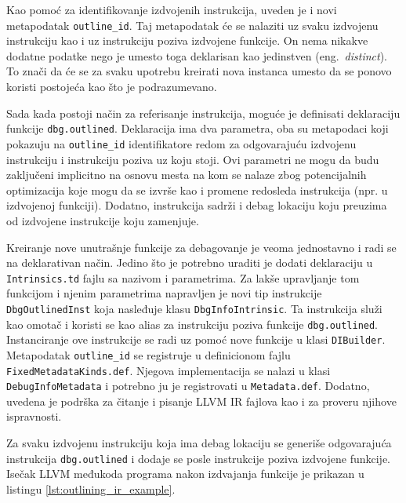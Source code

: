 \documentclass[12pt,oneside]{memoir}
\begin{document}
Kao pomoć za identifikovanje izdvojenih instrukcija, uveden je i novi metapodatak \verb|outline_id|.
Taj metapodatak će se nalaziti uz svaku izdvojenu instrukciju kao i uz instrukciju poziva izdvojene funkcije.
On nema nikakve dodatne podatke nego je umesto toga deklarisan kao jedinstven (eng.~{\em distinct}).
To znači da će se za svaku upotrebu kreirati nova instanca umesto da se ponovo koristi postojeća kao što je podrazumevano.

Sada kada postoji način za referisanje instrukcija, moguće je definisati deklaraciju funkcije \verb|dbg.outlined|.
Deklaracija ima dva parametra, oba su metapodaci koji pokazuju na \verb|outline_id| identifikatore redom za odgovarajuću izdvojenu instrukciju i instrukciju poziva uz koju stoji.
Ovi parametri ne mogu da budu zaključeni implicitno na osnovu mesta na kom se nalaze zbog potencijalnih optimizacija koje mogu da se izvrše kao i promene redosleda instrukcija (npr. u izdvojenoj funkciji).
Dodatno, instrukcija sadrži i debag lokaciju koju preuzima od izdvojene instrukcije koju zamenjuje.

Kreiranje nove unutrašnje funkcije za debagovanje je veoma jednostavno i radi se na deklarativan način.
Jedino što je potrebno uraditi je dodati deklaraciju u \verb|Intrinsics.td| fajlu sa nazivom i parametrima.
Za lakše upravljanje tom funkcijom i njenim parametrima napravljen je novi tip instrukcije \verb|DbgOutlinedInst| koja nasleđuje klasu \verb|DbgInfoIntrinsic|.
Ta instrukcija služi kao omotač i koristi se kao alias za instrukciju poziva funkcije \verb|dbg.outlined|. 
Instanciranje ove instrukcije se radi uz pomoć nove funkcije u klasi \verb|DIBuilder|.
Metapodatak \verb|outline_id| se registruje u definicionom fajlu \verb|FixedMetadataKinds.def|.
Njegova implementacija se nalazi u klasi \verb|DebugInfoMetadata| i potrebno ju je registrovati u \verb|Metadata.def|.
Dodatno, uvedena je podrška za čitanje i pisanje LLVM IR fajlova kao i za proveru njihove ispravnosti.

Za svaku izdvojenu instrukciju koja ima debag lokaciju se generiše odgovarajuća instrukcija \verb|dbg.outlined| i dodaje se posle instrukcije poziva izdvojene funkcije.
Isečak LLVM međukoda programa nakon izdvajanja funkcije je prikazan u listingu \ref{lst:outlining_ir_example}.
\end{document}
